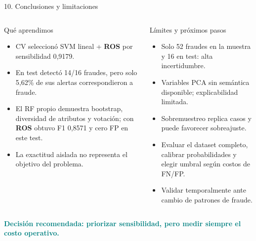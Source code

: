 \documentclass[aspectratio=169,10pt]{beamer}
\newcommand{\good}[1]{\textcolor{teal}{\textbf{#1}}}
\newcommand{\ros}{\textbf{ROS}}
\begin{document}
\begin{frame}{10. Conclusiones y limitaciones}
  \small
  \begin{columns}[T,onlytextwidth]
      \begin{block}{Qué aprendimos}
        \begin{itemize}\setlength\itemsep{.30em}
          \item CV seleccionó SVM lineal + \ros{} por sensibilidad 0,9179.
          \item En test detectó 14/16 fraudes, pero solo 5,62\% de sus alertas
                correspondieron a fraude.
          \item El RF propio demuestra bootstrap, diversidad de atributos y
                votación; con \ros{} obtuvo F1 0,8571 y cero FP en este test.
          \item La exactitud aislada no representa el objetivo del problema.
        \end{itemize}
      \end{block}
      \begin{block}{Límites y próximos pasos}
        \begin{itemize}\setlength\itemsep{.30em}
          \item Solo 52 fraudes en la muestra y 16 en test: alta incertidumbre.
          \item Variables PCA sin semántica disponible; explicabilidad limitada.
          \item Sobremuestreo replica casos y puede favorecer sobreajuste.
          \item Evaluar el dataset completo, calibrar probabilidades y elegir
                umbral según costos de FN/FP.
          \item Validar temporalmente ante cambio de patrones de fraude.
        \end{itemize}
      \end{block}
  \end{columns}
  \vspace{.15em}
  \centering\normalsize\good{Decisión recomendada: priorizar sensibilidad, pero medir siempre el costo operativo.}
\end{frame}

\appendix
\end{document}

